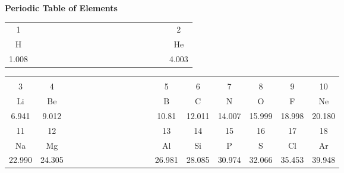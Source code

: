 \documentclass[10pt,landscape]{article}
\begin{document}
\thispagestyle{empty}
\Large
\begin{center}
\textcolor[rgb]{0.15,0.15,0.55}{{\huge \bf \sc \hspace{-1cm} Periodic Table of Elements}\\[-0.3cm]}
\begin{tabular}{|c|p{10.7mm}*{14}{p{9.86mm}}p{12.2mm}|c|}
\cline{1-1}\cline{18-18}
{\small 1} &&&&&&&&&&&&&&&&& \small 2\\[-1mm]
H &&&&&&&&&&&&&&&&& He\\[-2mm]
\small \hspace{1.6mm}1.008\hspace{1.65mm} &&&&&&&&&&&&&&&&& \small \hspace{1.55mm}4.003\hspace{2.25mm}\\\cline{1-2}\cline{13-18}
\end{tabular}
\begin{tabular}{|c|c|p{17.8mm}*{9}{p{8.98mm}}|c|c|c|c|c|c|}
&&&&&&&&&&&&&&&&&\\[-6.6mm]
\small 3 & \small 4 &&&&&&&&&&& \small 5 & \small 6 & \small 7 & \small 8 & \small 9 & \small 10\\[-1mm]
Li & Be &&&&&&&&&&& B & C & N & O & F & Ne\\[-2mm]
\small 6.941 & \small 9.012\hspace{0.5mm} &&&&&&&&&&& \small 10.81 & \small 12.011 & \small 14.007  & \small 15.999& \small 18.998 & \small 20.180 \\[-1mm]\cline{1-2}\cline{13-18}
\small 11 & \small 12 &&&&&&&&&&& \small 13 & \small 14 & \small 15 & \small 16 & \small 17 & \small 18\\[-1mm]
Na & Mg &&&&&&&&&&& Al & Si & P& S & Cl& Ar\\[-2mm]
\small \hspace{0.75mm}22.990\hspace{0.8mm} & \small \hspace{0.83mm}24.305\hspace{0.83mm} &&&&&&&&&&& \small \hspace{0.8mm}26.981\hspace{0.78mm} & \small \hspace{0.95mm}28.085\hspace{0.73mm} & \small \hspace{0.8mm}30.974\hspace{0.8mm}  & \small 32.066 & \small \hspace{0.8mm}35.453\hspace{0.8mm} & \small 39.948\\

\end{tabular}
\end{center}
\end{document}
